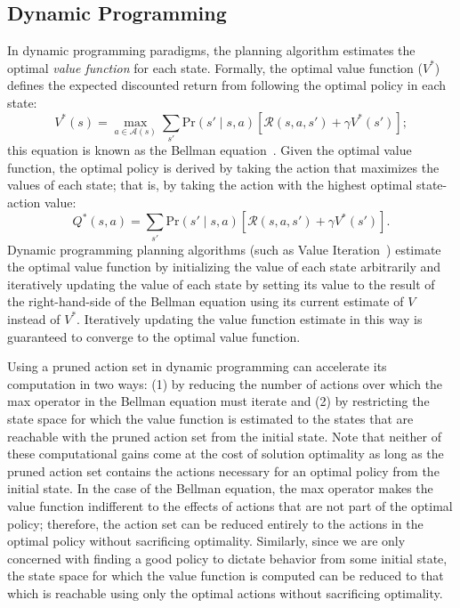 \documentclass[]{article}
\newcommand{\stnote}[1]{\textcolor{Blue}{\textbf{ST: #1}}}
\newcommand{\dnote}[1]{\textcolor{Orange}{\textbf{D: #1}}}
\begin{document}
\subsection{Dynamic Programming}
In dynamic programming paradigms, the planning algorithm estimates the
optimal {\em value function} for each state. Formally, the optimal
value function ($V^*$) defines the expected discounted return from
following the optimal policy in each state:
\begin{equation}
\label{eq:bellman}
V^*(s) = \max_{a \in \mathcal{A}(s)} \sum_{s'} \text{Pr}(s' \mid s, a)\left[\mathcal{R}(s,a,s') + \gamma V^*(s') \right];
\end{equation}
this equation is known as the Bellman
equation~\citep{bellman57}. Given the optimal value function, the
optimal policy is derived by taking the action that maximizes the
values of each state; that is, by taking the action with the
highest optimal state-action value:
\begin{equation}
\label{eq:qvalue}
Q^*(s,a) = \sum_{s'} \text{Pr}(s' \mid s, a)\left[\mathcal{R}(s,a,s') + \gamma V^*(s') \right].
\end{equation}
Dynamic programming planning algorithms (such as Value
Iteration~\citep{bellman57}) estimate the optimal value function by
initializing the value of each state arbitrarily and iteratively
updating the value of each state by setting its value to the result of
the right-hand-side of the Bellman equation using its current estimate
of $V$ instead of $V^*$. Iteratively updating the value function
estimate in this way is guaranteed to converge to the optimal value
function.

Using a pruned action set in dynamic programming can accelerate its
computation in two ways: (1) by reducing the number of actions over
which the max operator in the Bellman equation must iterate and (2) by
restricting the state space for which the value function is estimated
to the states that are reachable with the pruned action set from the
initial state. Note that neither of these computational gains come at
the cost of solution optimality as long as the pruned action set
contains the actions necessary for an optimal policy from the initial
state. In the case of the Bellman equation, the max operator makes the
value function indifferent to the effects of actions that are not part
of the optimal policy; therefore, the action set can be reduced
entirely to the actions in the optimal policy without sacrificing
optimality. Similarly, since we are only concerned with finding a good
policy to dictate behavior from some initial state, the state space
for which the value function is computed can be reduced to that which
is reachable using only the optimal actions without sacrificing
optimality.  
\end{document}
